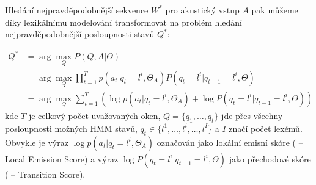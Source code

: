 Hledání nejpravděpodobnější sekvence $W^*$ pro akustický vstup $A$ pak můžeme díky lexikálnímu modelování transformovat na problém hledání nejpravděpodobnější posloupnosti stavů $Q^*$:

\begin{align}
	\label{eq:lm_state}
	Q^* &= \arg \max_Q P(Q,A|\Theta)\\
	    &= \arg \max_Q \prod\limits_{t=1}^T p(a_t|q_t = l^i, \Theta_A) P(q_t = l^i|q_{t-1} = l^i, \Theta)\\
	    &= \arg \max_Q \sum\limits_{t=1}^T (\log p(a_t|q_t = l^i, \Theta_A) + \log P(q_t = l^i|q_{t-1} = l^i, \Theta)) 
\end{align}
%
kde $T$ je celkový počet uvažovaných oken, $Q = \{q_1,\dots,q_t\}$ jde přes všechny posloupnosti možných HMM stavů, $q_t \in \{l^1,\dots,l^i,\dots,l^I\}$ a $I$ značí počet lexémů. Obvykle je výraz $\log p(a_t|q_t = l^i, \Theta_A)$ označován jako lokální emisní skóre ( -- Local Emission Score) a výraz 
$\log P(q_t = l^i|q_{t-1} = l^i, \Theta)$ jako přechodové skóre ( -- Transition Score).